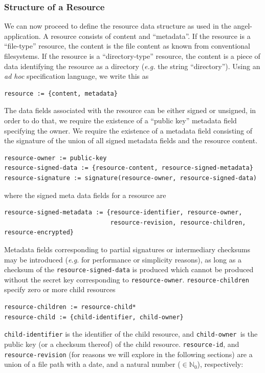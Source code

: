 \documentclass[11pt]{article}
\begin{document}
\begin{mainmatter}
\subsubsection{Structure of a Resource}
\label{resource-structure}
We can now proceed to define the resource data structure as used in the angel-application. A resource consists of content and ``metadata''. If the resource is a ``file-type'' resource, the content is the file content as known from conventional filesystems. If the resource is a ``directory-type'' resource, the content is a piece of data identifying the resource as a directory (\emph{e.g.} the string ``directory''). Using an \emph{ad hoc} specification language, we write this as
\begin{verbatim}
resource := {content, metadata}
\end{verbatim}
The data fields associated with the resource can be either signed or unsigned, in order to do that, we require the existence of a ``public key'' metadata field specifying the owner. We require the existence of a metadata field consisting of the signature of the union of all signed metadata fields and the resource content. 
\begin{verbatim}
resource-owner := public-key
resource-signed-data := {resource-content, resource-signed-metadata}
resource-signature := signature(resource-owner, resource-signed-data)
\end{verbatim}
where the signed meta data fields for a resource are
\begin{verbatim}
resource-signed-metadata := {resource-identifier, resource-owner, 
                             resource-revision, resource-children, resource-encrypted}
\end{verbatim} \label{revision}
Metadata fields corresponding to partial signatures or intermediary checksums may be introduced (\emph{e.g.} for performance or simplicity reasons), as long as a checksum of the \texttt{resource-signed-data} is produced which cannot be produced without the secret key corresponding to \texttt{resource-owner}.
\texttt{resource-children} specify zero or more child resources
\begin{verbatim}
resource-children := resource-child*
resource-child := {child-identifier, child-owner}
\end{verbatim}
\texttt{child-identifier} is the identifier of the child resource, and \texttt{child-owner }is the public key (or a checksum thereof) of the child resource. \texttt{resource-id}, and \texttt{resource-revision} (for reasons we will explore in the following sections) are a union of a file path with a date, and a natural number ($\in \mathbb N_0$), respectively:

\end{mainmatter}
\end{document}
